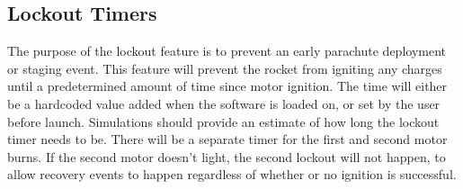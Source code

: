 \subsection*{Lockout Timers}
The purpose of the lockout feature is to prevent an early parachute deployment or staging event. This feature will prevent the rocket from igniting any charges until a predetermined amount of time since motor ignition. The time will either be a hardcoded value added when the software is loaded on, or set by the user before launch. Simulations should provide an estimate of how long the lockout timer needs to be. There will be a separate timer for the first and second motor burns. If the second motor doesn’t light, the second lockout will not happen, to allow recovery events to happen regardless of whether or no ignition is successful. 


\pagebreak